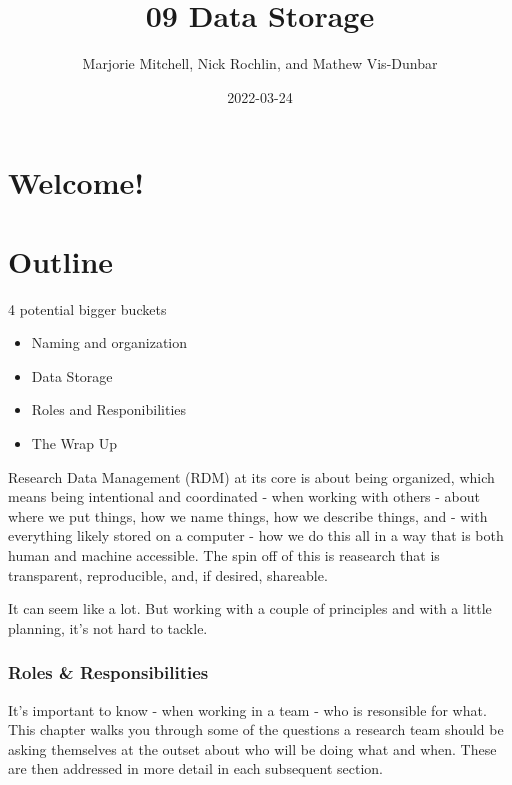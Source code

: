 \documentclass[
]{book}
\title{09 Data Storage}
\author{Marjorie Mitchell, Nick Rochlin, and Mathew Vis-Dunbar}
\date{2022-03-24}
\providecommand{\tightlist}{%
  \setlength{\itemsep}{0pt}\setlength{\parskip}{0pt}}
\begin{document}
\maketitle

{
\setcounter{tocdepth}{1}
\tableofcontents
}
\hypertarget{welcome}{%
\chapter*{Welcome!}\label{welcome}}

\hypertarget{outline}{%
\chapter*{Outline}\label{outline}}

4 potential bigger buckets

\begin{itemize}
\tightlist
\item
  Naming and organization
\item
  Data Storage
\item
  Roles and Responibilities
\item
  The Wrap Up
\end{itemize}

Research Data Management (RDM) at its core is about being organized, which means being intentional and coordinated - when working with others - about where we put things, how we name things, how we describe things, and - with everything likely stored on a computer - how we do this all in a way that is both human and machine accessible. The spin off of this is reasearch that is transparent, reproducible, and, if desired, shareable.

It can seem like a lot. But working with a couple of principles and with a little planning, it's not hard to tackle.

\hypertarget{roles-responsibilities}{%
\subsection*{Roles \& Responsibilities}\label{roles-responsibilities}}

It's important to know - when working in a team - who is resonsible for what. This chapter walks you through some of the questions a research team should be asking themselves at the outset about who will be doing what and when. These are then addressed in more detail in each subsequent section.
\end{document}

